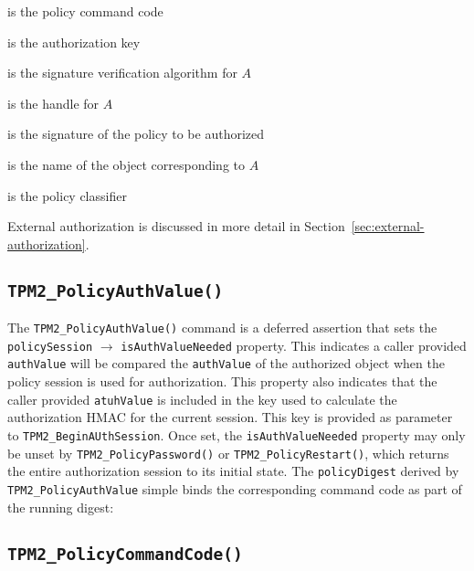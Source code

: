 \documentclass{sig-alternate-2013}
\begin{document}
\begin{description}[itemsep=.1cm]
  \small
  \item[$TPM\_CC\_PolicyAuthorize$] \hfill is the policy command code
  \item[$A$]                 \hfill is the authorization key
  \item[$\mathbf{V}()$]      \hfill is the signature verification algorithm for $A$
  \item[$keyHandle_{A}$]     \hfill is the handle for $A$
  \item[$signature$]         \hfill is the signature of the policy to be authorized
  \item[$keyName_{A}$]       \hfill is the name of the object corresponding to $A$
  \item[$policyRef$]         \hfill is the policy classifier
\end{description}

External authorization is discussed in more detail in
Section~\ref{sec:external-authorization}.

\subsection{\texttt{TPM2\_PolicyAuthValue()}}

The \texttt{TPM2\_PolicyAuthValue()} command is a deferred assertion that sets
the \texttt{policySession} $\rightarrow$ \texttt{isAuthValueNeeded} property.
This indicates a caller provided \texttt{authValue} will be compared the
\texttt{authValue} of the authorized object when the policy session is used for
authorization. This property also indicates that the caller provided
\texttt{atuhValue} is included in the key used to calculate the authorization
HMAC for the current session. This key is provided as parameter to
\texttt{TPM2\_BeginAUthSession}. Once set, the \texttt{isAuthValueNeeded}
property may only be unset by \texttt{TPM2\_PolicyPassword()} or
\texttt{TPM2\_PolicyRestart()}, which returns the entire authorization session
to its initial state. The \texttt{policyDigest} derived by
\texttt{TPM2\_PolicyAuthValue} simple binds the corresponding command code as
part of the running digest:

\vspace{.5\baselineskip}
\noindent
{}

\subsection{\texttt{TPM2\_PolicyCommandCode()}}
\end{document}
